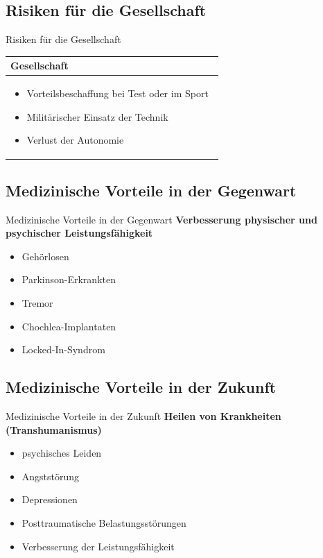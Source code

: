 \documentclass[aspectratio=169,16pt,xcolor=table]{beamer}
\begin{document}
\subsection{Risiken für die Gesellschaft}
\begin{frame}{Risiken für die Gesellschaft}
\centering
\renewcommand{\arraystretch}{1.5} %
\begin{tabular}{|p{12cm}|}
    \hline
    \rowcolor{blue!25}
    \textbf{Gesellschaft} \\
    \hline
    \begin{itemize}
        \item Vorteilsbeschaffung bei Test oder im Sport~\cite{khan_aziz_2019}
        \item Militärischer Einsatz der Technik
        \item Verlust der Autonomie~\cite{khan_aziz_2019}
    \end{itemize} \\
    \hline
\end{tabular}

\end{frame}




\subsection{Medizinische Vorteile in der Gegenwart}
\begin{frame}{Medizinische Vorteile in der Gegenwart}
\textbf{Verbesserung physischer und psychischer Leistungsfähigkeit}
	\begin{itemize}
		\item{Gehörlosen}
		\item{Parkinson-Erkrankten}
		\item{Tremor}
    \item{Chochlea-Implantaten}
    \item{Locked-In-Syndrom}
        \end{itemize}
\end{frame}



\subsection{Medizinische Vorteile in der Zukunft}
\begin{frame}{Medizinische Vorteile in der Zukunft}
\textbf{Heilen von Krankheiten (Transhumanismus)}
	\begin{itemize}
		\item{psychisches Leiden}
		\item{Angststörung}
		\item{Depressionen}
    \item{Posttraumatische Belastungsstörungen}
    \item{Verbesserung der Leistungsfähigkeit}
        \end{itemize}
\end{frame}
\end{document}
